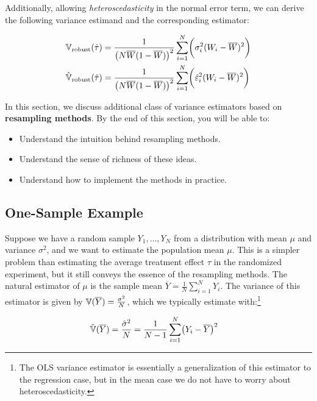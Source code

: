 Additionally, allowing \textit{heteroscedasticity} in the normal error term, we can derive the following variance estimand and the corresponding estimator:

\begin{align}
    {\mathbb{V}}_\text{robust}(\hat\tau) &=\frac{1}{\bigl(N\overline{W}(1-\overline{W})\bigr)^2}\sum_{i=1}^N \biggl(\sigma_i^2(W_i - \overline{W})^2\biggr)\label{eq:heteroscedastic_variance}\\
    \hat{{\mathbb{V}}}_\text{robust}(\hat\tau) &= \frac{1}{\bigl(N\overline{W}(1-\overline{W})\bigr)^2}\sum_{i=1}^N \biggl(\hat{\varepsilon}_i^2(W_i - \overline{W})^2\biggr)\label{eq:heteroscedastic_variance_estimator}
\end{align}

In this section, we discuss additional class of variance estimators based on \textbf{resampling methods}. 
By the end of this section, you will be able to:
\begin{itemize}
    \item Understand the intuition behind resampling methods.
    \item Understand the sense of richness of these ideas.
    \item Understand how to implement the methods in practice.
\end{itemize}


\subsection{One-Sample Example}

Suppose we have a random sample $Y_1, \ldots, Y_N$ from a distribution with mean $\mu$ and variance $\sigma^2$, and we want to estimate the population mean $\mu$.
This is a simpler problem than estimating the average treatment effect $\tau$ in the randomized experiment, but it still conveys the essence of the resampling methods.
The natural estimator of $\mu$ is the sample mean $\overline{Y} = \frac{1}{N}\sum_{i=1}^N Y_i$.
The variance of this estimator is given by ${\mathbb{V}}(\overline{Y}) = \frac{\sigma^2}{N}$, which we typically estimate with:\footnote{The OLS variance estimator is essentially a generalization of this estimator to the regression case, but in the mean case we do not have to worry about heteroscedasticity.}

\begin{align}
    \hat{{\mathbb{V}}}(\overline{Y}) &= \frac{\hat{\sigma}^2}{N} = \frac{1}{N-1}\sum_{i=1}^N \bigl(Y_i - \overline{Y}\bigr)^2\label{eq:one_sample_variance_estimator}
\end{align}

